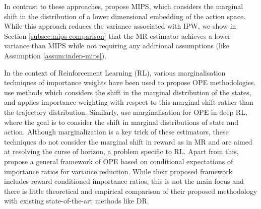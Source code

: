 
In contrast to these approaches, \cite{saito2022off} propose MIPS, which considers the marginal shift in the distribution of a lower dimensional embedding of the action space. While this approach reduces the variance associated with IPW, we show in Section \ref{subsec:mips-comparison} that the MR estimator achieves a lower variance than MIPS while not requiring any additional assumptions (like Assumption \ref{assum:indep-mips}).

In the context of Reinforcement Learning (RL), various marginalisation techniques of importance weights have been used to propose OPE methodologies.
\cite{liu2018breaking, xie2019advances, kallus2020off} use methods which considers the shift in the marginal distribution of the states, and applies importance weighting with respect to this marginal shift rather than the trajectory distribution. Similarly, \cite{Fujimoto2021deep} use marginalisation for OPE in deep RL, where the goal is to consider the shift in marginal distributions of state and action. Although marginalization is a key trick of these estimators, these techniques do not consider the marginal shift in reward as in MR and are aimed at resolving the curse of horizon, a problem specific to RL. Apart from this, \cite{rowland2020conditional} propose a general framework of OPE based on conditional expectations of importance ratios for variance reduction. While their proposed framework includes reward conditioned importance ratios, this is not the main focus and there is little theoretical and empirical comparison of their proposed methodology with existing state-of-the-art methods like DR. 

